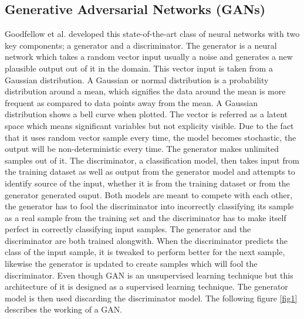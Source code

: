 \documentclass[conference]{IEEEtran}
\begin{document}
\subsection{Generative Adversarial Networks (GANs)}
Goodfellow et al. developed this state-of-the-art class of neural networks with two key components; a generator and a discriminator. The generator is a neural network which takes a random vector input usually a noise and generates a new plausible output out of it in the domain. This vector input is taken from a Gaussian distribution. A Gaussian or normal distribution is a probability distribution around a mean, which signifies the data around the mean is more frequent as compared to data points away from the mean. A Gaussian distribution shows a bell curve when plotted. The vector is referred as a latent space which means significant variables but not explicity visible. Due to the fact that it uses random vector sample every time, the model becomes stochastic, the output will be non-deterministic every time. The generator makes unlimited samples out of it. The discriminator, a classification model, then takes input from the training dataset as well as output from the generator model and attempts to identify source of the input, whether it is from the training dataset or from the generator generated ouput. Both models are meant to compete with each other, the generator has to fool the discriminator into incorrectly classifying its sample as a real sample from the training set and the discriminator has to make itself perfect in correctly classifying input samples. The generator and the discriminator are both trained alongwith. When the discriminator predicts the class of the input sample, it is tweaked to perform better for the next sample, likewise the generator is updated to create samples which will fool the discriminator. Even though GAN is an unsupervised learning technique but this architecture of it is designed as a supervised learning technique. The generator model is then used discarding the discriminator model. The following figure \ref{fig1} describes the working of a GAN.
\end{document}
